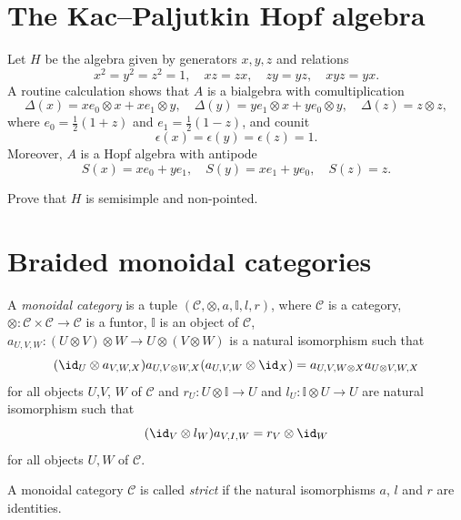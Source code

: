 \section{The Kac--Paljutkin Hopf algebra}

Let $H$ be the algebra given by generators 
$x,y,z$ and relations 
\[
x^2=y^2=z^2=1,\quad 
xz=zx,\quad 
zy=yz,\quad 
xyz=yx.
\]
A routine calculation shows that $A$ is a bialgebra 
with 
comultiplication 
\[
\Delta(x)=xe_0\otimes x+xe_1\otimes y,
\quad 
\Delta(y)=ye_1\otimes x+ye_0\otimes y,
\quad 
\Delta(z)=z\otimes z,
\]
where $e_0=\frac12(1+z)$ and $e_1=\frac12(1-z)$, and 
counit 
\[
\epsilon(x)=\epsilon(y)=\epsilon(z)=1.
\]
Moreover, $A$ is a Hopf algebra 
with antipode 
\[
S(x)=xe_0+ye_1,\quad 
S(y)=xe_1+ye_0,\quad 
S(z)=z.
\]

\begin{exercise}
\label{xca: KacPaljutkin}
    Prove that $H$
    is semisimple and non-pointed. 
\end{exercise}


\section{Braided monoidal categories}
\begin{definition}
A \emph{monoidal category} is a tuple
$(\mathcal{C},\otimes,a,\mathbb{I},l,r)$, where $\mathcal{C}$ is a category,
$\otimes:\mathcal{C}\times\mathcal{C}\to\mathcal{C}$ is a funtor, $\mathbb{I}$
is an object of $\mathcal{C}$, $a_{U,V,W}:(U\otimes V)\otimes W\to
U\otimes(V\otimes W)$ is a natural isomorphism such that 
\begin{equation}
(\id_{U}\otimes a_{V,W,X})a_{U,V\otimes W,X}(a_{U,V,W}\otimes\id_{X})=a_{U,V,W\otimes X}a_{U\otimes V,W,X}\label{eq:pentagon}
\end{equation}
for all objects $U$,$V$, $W$ of $\mathcal{C}$ and $r_{U}:U\otimes\mathbb{I}\to U$
and $l_{U}:\mathbb{I}\otimes U\to U$ are natural isomorphism such
that 
\begin{equation}
(\id_{V}\otimes l_{W})a_{V,I,W}=r_{V}\otimes\id_{W}\label{eq:triangles}
\end{equation}
for all objects $U,W$ of $\mathcal{C}$.
\end{definition}

\begin{definition}
A monoidal category $\mathcal{C}$ is called \emph{strict} if the natural
isomorphisms $a$, $l$ and $r$ are identities. 
\end{definition}

